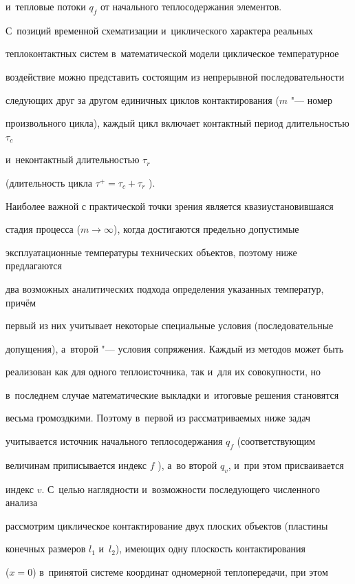 и~тепловые потоки $q_f$  от начального теплосодержания элементов. 

С~позиций временной схематизации и~циклического характера реальных 

теплоконтактных систем в~математической модели циклическое температурное 

воздействие можно представить состоящим из непрерывной последовательности 

следующих друг за другом единичных циклов контактирования ($m$ "--- номер 

произвольного цикла), каждый цикл включает контактный период длительностью $\tau _c $ 

и~неконтактный  длительностью $\tau _r $ 

(длительность цикла $\tau ^ + = \tau _c + \tau _r $ ).



Наиболее важной с практической точки зрения является квазиустановившаяся 

стадия процесса ($m \to \infty $), когда достигаются предельно допустимые 

эксплуатационные температуры технических объектов, поэтому ниже предлагаются 

два возможных аналитических подхода определения указанных температур, причём 

первый из них учитывает некоторые специальные условия (последовательные 

допущения), а~второй "--- условия сопряжения. Каждый из методов может быть 

реализован как для одного теплоисточника, так и~для их совокупности, но 

в~последнем случае математические выкладки и~итоговые решения становятся 

весьма громоздкими. Поэтому в~первой из рассматриваемых ниже задач 

учитывается источник начального теплосодержания $q_f $ (соответствующим 

величинам приписывается индекс $f$ ), а~во второй $q_v$, и~при этом присваивается 

индекс $v$. С~целью наглядности и~возможности последующего численного анализа 

рассмотрим циклическое контактирование двух плоских объектов (пластины 

конечных размеров $l_{1}$ и~$l_{2}$), имеющих одну плоскость контактирования 

($x = 0$) в~принятой системе координат одномерной теплопередачи, при этом 

